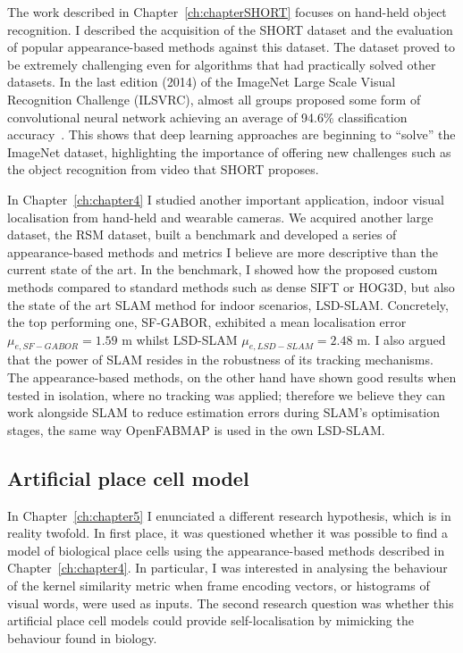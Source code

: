 The work described in Chapter~\ref{ch:chapterSHORT} focuses on hand-held object recognition. I described the acquisition of the SHORT dataset and the evaluation of popular appearance-based methods a\-gainst this dataset. The dataset proved to be extremely challenging even for algorithms that had practically solved other datasets. In the last edition (2014) of the ImageNet Large Scale Visual Recognition Challenge (ILSVRC), almost all groups proposed some form of convolutional neural network achieving an average of 94.6\% classification accuracy~\cite{russakovsky2014imagenet}. This shows that deep learning approaches are beginning to ``solve'' the ImageNet dataset, highlighting the importance of offering new challenges such as the object recognition from video that SHORT proposes. 

In Chapter~\ref{ch:chapter4} I studied another important application, indoor visual localisation from hand-held and wearable cameras. We acquired another large dataset, the RSM dataset, built a benchmark and developed a series of appearance-based methods and metrics I believe are more descriptive than the current state of the art. In the benchmark, I showed how the proposed custom methods compared to standard methods such as dense SIFT or HOG3D, but also the state of the art SLAM method for indoor scenarios, LSD-SLAM. Concretely, the top performing one, SF-GABOR, exhibited a mean localisation error $\mu_{e,SF-GABOR} = 1.59 $ m whilst LSD-SLAM $\mu_{e,LSD-SLAM} = 2.48 $ m.  I also argued that the power of SLAM resides in the robustness of its tracking mechanisms. The appearance-based methods, on the other hand have shown good results when tested in isolation, where no tracking was applied; therefore we believe they can work alongside SLAM to reduce estimation errors during SLAM's optimisation stages, the same way OpenFABMAP is used in the own LSD-SLAM.


\subsection{Artificial place cell model}

In Chapter~\ref{ch:chapter5} I enunciated a different research hypothesis, which is in reality twofold. In first place, it was questioned whether it was possible to find  a model of biological place cells using the appearance-based methods described in Chapter~\ref{ch:chapter4}. In particular, I was interested in analysing the behaviour of the kernel similarity metric when frame encoding vectors, or histograms of visual words, were used as inputs. The second research question was whether this artificial place cell models could provide self-localisation by mimicking the behaviour found in biology.

